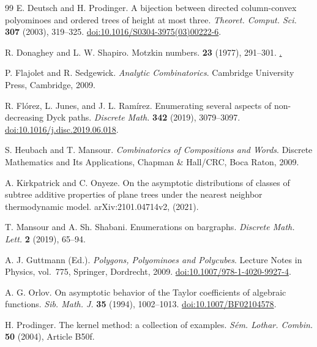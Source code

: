 \documentclass[12pt]{amsart}
\theoremstyle{plain}
\theoremstyle{definition}
\begin{document}
\begin{thebibliography}{99}
E. Deutsch and H. Prodinger.
\newblock A bijection between directed column-convex polyominoes and
ordered trees of height at most three.
\newblock \emph{Theoret. Comput. Sci.} \textbf{307} (2003), 319--325.
\newblock \href{https://doi.org/10.1016/S0304-3975(03)00222-6}
{doi:10.1016/S0304-3975(03)00222-6}.

R. Donaghey and L. W. Shapiro.
\newblock Motzkin numbers.
 \textbf{23} (1977), 291--301.
\newblock \href{https://doi.org/10.1016/0097-3165(77)90020-6}.


P. Flajolet and R. Sedgewick.
\newblock \emph{Analytic Combinatorics}.
\newblock Cambridge University Press, Cambridge, 2009.


R. Fl\'orez, L. Junes, and J. L. Ram\'irez.
\newblock Enumerating several aspects of non-decreasing Dyck paths.
\newblock \emph{Discrete Math.} \textbf{342} (2019), 3079--3097.
\newblock \href{https://doi.org/10.1016/j.disc.2019.06.018}
{doi:10.1016/j.disc.2019.06.018}.

S. Heubach and T. Mansour.
\newblock \emph{Combinatorics of Compositions and Words}.
\newblock Discrete Mathematics and Its Applications,
Chapman \& Hall/CRC, Boca Raton, 2009.

A. Kirkpatrick and C. Onyeze.
\newblock On the asymptotic distributions of classes of subtree additive
properties of plane trees under the nearest neighbor thermodynamic model.
\newblock arXiv:2101.04714v2, (2021).

T. Mansour and A. Sh. Shabani.
\newblock Enumerations on bargraphs.
\newblock \emph{Discrete Math. Lett.} \textbf{2} (2019), 65--94.

A. J. Guttmann (Ed.).
\newblock \emph{Polygons, Polyominoes and Polycubes}.
\newblock Lecture Notes in Physics, vol.~775, Springer, Dordrecht, 2009.
\newblock \href{https://doi.org/10.1007/978-1-4020-9927-4}
{doi:10.1007/978-1-4020-9927-4}.

A. G. Orlov.
\newblock On asymptotic behavior of the Taylor coefficients of algebraic functions.
\newblock \emph{Sib. Math. J.} \textbf{35} (1994), 1002--1013.
\newblock \href{https://doi.org/10.1007/BF02104578}
{doi:10.1007/BF02104578}.

H. Prodinger.
\newblock The kernel method: a collection of examples.
\newblock \emph{S\'em. Lothar. Combin.} \textbf{50} (2004), Article B50f.



\end{thebibliography}
\end{document}
